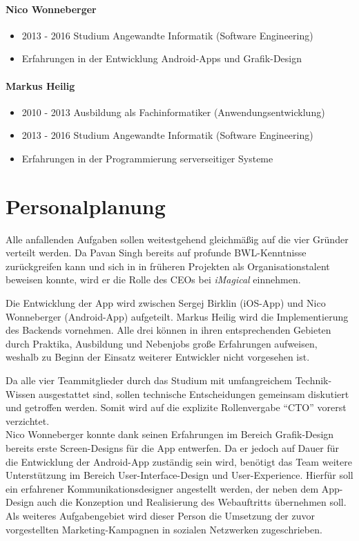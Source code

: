 \paragraph{Nico Wonneberger}
\begin{itemize}
\item 2013 - 2016 Studium Angewandte Informatik (Software Engineering)
\item Erfahrungen in der Entwicklung Android-Apps und Grafik-Design
\end{itemize}

\paragraph{Markus Heilig}
\begin{itemize}
\item 2010 - 2013 Ausbildung als Fachinformatiker (Anwendungsentwicklung)
\item 2013 - 2016 Studium Angewandte Informatik (Software Engineering)
\item Erfahrungen in der Programmierung serverseitiger Systeme
\end{itemize}


\section{Personalplanung}

Alle anfallenden Aufgaben sollen weitestgehend gleichmäßig auf die vier Gründer verteilt werden.
Da Pavan Singh bereits auf profunde BWL-Kenntnisse zurückgreifen kann und sich in in früheren Projekten als Organisationstalent beweisen konnte, wird er die Rolle des CEOs bei \textit{iMagical} einnehmen.

Die Entwicklung der App wird zwischen Sergej Birklin (iOS-App) und Nico Wonneberger (Android-App) aufgeteilt. Markus Heilig wird die Implementierung des Backends vornehmen. Alle drei können in ihren entsprechenden Gebieten durch Praktika, Ausbildung und Nebenjobs große Erfahrungen aufweisen, weshalb zu Beginn der Einsatz weiterer Entwickler nicht vorgesehen ist.

Da alle vier Teammitglieder durch das Studium mit umfangreichem Technik-Wissen ausgestattet sind, sollen technische Entscheidungen gemeinsam diskutiert und getroffen werden. Somit wird auf die explizite Rollenvergabe ``CTO'' vorerst verzichtet. \\

Nico Wonneberger konnte dank seinen Erfahrungen im Bereich Grafik-Design bereits erste Screen-Designs für die App entwerfen.
Da er jedoch auf Dauer für die Entwicklung der Android-App zuständig sein wird, benötigt das Team weitere Unterstützung im Bereich User-Interface-Design und User-Experience. Hierfür soll ein erfahrener Kommunikationsdesigner angestellt werden, der neben dem App-Design auch die Konzeption und Realisierung des Webauftritts übernehmen soll. Als weiteres Aufgabengebiet wird dieser Person die Umsetzung der zuvor vorgestellten Marketing-Kampagnen in sozialen Netzwerken zugeschrieben.



